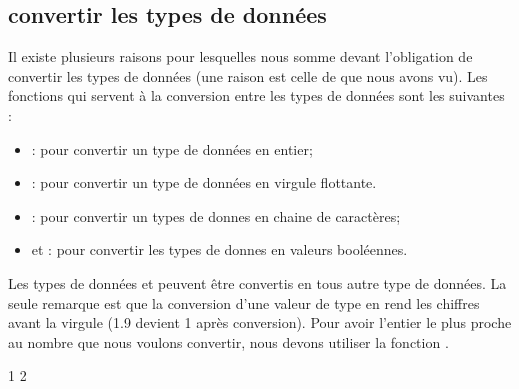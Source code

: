 \documentclass[letterpaper,10pt,french]{sphinxmanual}
\begin{document}
\subsection{convertir les types de données}
\label{\detokenize{ch1:convertir-les-types-de-donnees}}
\sphinxAtStartPar
Il existe plusieurs raisons pour lesquelles nous somme devant l’obligation de convertir les types de données (une raison est celle de  que nous avons vu). Les fonctions qui servent à la conversion entre les types de données sont les suivantes :
\begin{itemize}
\item {} 
\sphinxAtStartPar
{}: pour convertir un type de données en entier;

\item {} 
\sphinxAtStartPar
{}: pour convertir un type de données en virgule flottante.

\item {} 
\sphinxAtStartPar
{}: pour convertir un types de donnes en chaine de caractères;

\item {} 
\sphinxAtStartPar
et : pour convertir les types de donnes en valeurs booléennes.

\end{itemize}

\sphinxAtStartPar
Les types de données  et  peuvent être convertis en tous autre type de données. La seule remarque est que la conversion d’une valeur de type  en  rend les chiffres avant la virgule (1.9 devient 1 après conversion). Pour avoir l’entier le plus proche au nombre que nous voulons convertir, nous devons utiliser la fonction .

\begin{sphinxVerbatim}[commandchars=\\\{\}]
\end{sphinxVerbatim}

\begin{sphinxVerbatim}[commandchars=\\\{\}]
1
2
\end{sphinxVerbatim}
\end{document}
